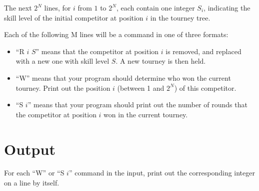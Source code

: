 The next $2^N$ lines, for $i$ from $1$ to $2^N$, each contain one integer $S_i$, indicating the
skill level of the initial competitor at position $i$ in the tourney tree.

Each of the following M lines will be a command in one of three formats:
\begin{itemize}
\item ``R $i$ $S$'' means that the competitor at position $i$ is removed, and replaced with a new
one with skill level $S$. A new tourney is then held.
\item ``W'' means that your program should determine who won the current tourney. Print out the
position $i$ (between 1 and $2^N$) of this competitor.
\item “S $i$” means that your program should print out the number of rounds that the competitor at
position $i$ won in the current tourney.
\end{itemize}

\section*{Output}
For each ``W'' or ``S $i$'' command in the input, print out the corresponding integer on a line by
itself.
